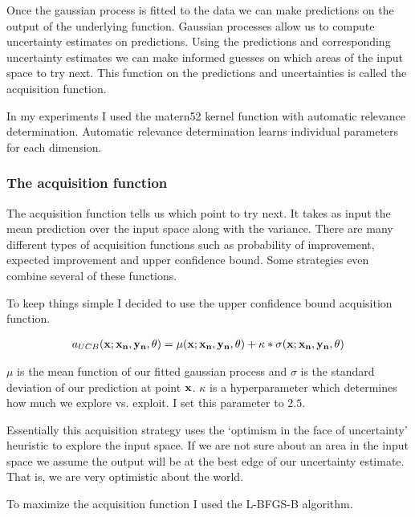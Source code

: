 Once the gaussian process is fitted to the data we can make predictions on the output of the underlying function. Gaussian processes allow us to compute uncertainty estimates on predictions. Using the predictions and corresponding uncertainty estimates we can make informed guesses on which areas of the input space to try next. This function on the predictions and uncertainties is called the acquisition function.

In my experiments I used the matern52 kernel function with automatic relevance determination. Automatic relevance determination learns individual parameters for each dimension.

\subsubsection{The acquisition function}

The acquisition function tells us which point to try next. It takes as input the mean prediction over the input space along with the variance. There are many different types of acquisition functions such as probability of improvement, expected improvement and upper confidence bound. Some strategies even combine several of these functions. \citep{bayesian-opt}

To keep things simple I decided to use the upper confidence bound acquisition function.

\begin{align}
    a_{UCB}(\mathbf{x}; {\mathbf{\mathbf{x}_n, y_n}, \mathbf{\theta}}) = \mu(\mathbf{x}; {\mathbf{\mathbf{x}_n, y_n}, \mathbf{\theta}}) + \kappa * \sigma(\mathbf{x}; {\mathbf{\mathbf{x}_n, y_n}, \mathbf{\theta}})
\end{align}

$\mu$ is the mean function of our fitted gaussian process and $\sigma$ is the standard deviation of our prediction at point $\mathbf{x}$. $\kappa$ is a hyperparameter which determines how much we explore vs. exploit. I set this parameter to $2.5$.

Essentially this acquisition strategy uses the `optimism in the face of uncertainty' heuristic to explore the input space. If we are not sure about an area in the input space we assume the output will be at the best edge of our uncertainty estimate. That is, we are very optimistic about the world.

To maximize the acquisition function I used the L-BFGS-B algorithm.


